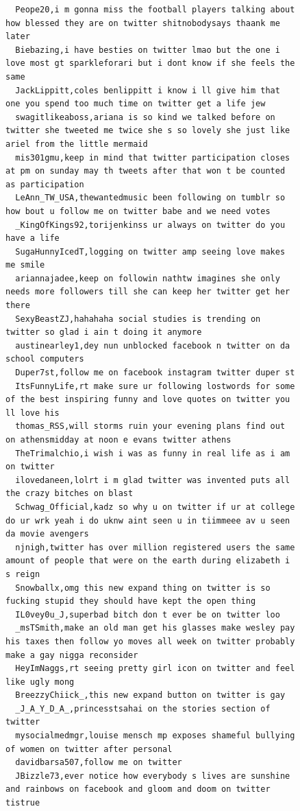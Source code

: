 \begin{figure}[htpb]
\begin{verbatim}
  Peope20,i m gonna miss the football players talking about how blessed they are on twitter shitnobodysays thaank me later
  Biebazing,i have besties on twitter lmao but the one i love most gt sparkleforari but i dont know if she feels the same
  JackLippitt,coles benlippitt i know i ll give him that one you spend too much time on twitter get a life jew
  swagitlikeaboss,ariana is so kind we talked before on twitter she tweeted me twice she s so lovely she just like ariel from the little mermaid
  mis301gmu,keep in mind that twitter participation closes at pm on sunday may th tweets after that won t be counted as participation
  LeAnn_TW_USA,thewantedmusic been following on tumblr so how bout u follow me on twitter babe and we need votes
  _KingOfKings92,torijenkinss ur always on twitter do you have a life
  SugaHunnyIcedT,logging on twitter amp seeing love makes me smile
  ariannajadee,keep on followin nathtw imagines she only needs more followers till she can keep her twitter get her there
  SexyBeastZJ,hahahaha social studies is trending on twitter so glad i ain t doing it anymore
  austinearley1,dey nun unblocked facebook n twitter on da school computers
  Duper7st,follow me on facebook instagram twitter duper st
  ItsFunnyLife,rt make sure ur following lostwords for some of the best inspiring funny and love quotes on twitter you ll love his
  thomas_RSS,will storms ruin your evening plans find out on athensmidday at noon e evans twitter athens
  TheTrimalchio,i wish i was as funny in real life as i am on twitter
  ilovedaneen,lolrt i m glad twitter was invented puts all the crazy bitches on blast
  Schwag_Official,kadz so why u on twitter if ur at college do ur wrk yeah i do uknw aint seen u in tiimmeee av u seen da movie avengers
  njnigh,twitter has over million registered users the same amount of people that were on the earth during elizabeth i s reign
  Snowballx,omg this new expand thing on twitter is so fucking stupid they should have kept the open thing
  IL0vey0u_J,superbad bitch don t ever be on twitter loo
  _msTSmith,make an old man get his glasses make wesley pay his taxes then follow yo moves all week on twitter probably make a gay nigga reconsider
  HeyImNaggs,rt seeing pretty girl icon on twitter and feel like ugly mong
  BreezzyChiick_,this new expand button on twitter is gay
  _J_A_Y_D_A_,princesstsahai on the stories section of twitter
  mysocialmedmgr,louise mensch mp exposes shameful bullying of women on twitter after personal
  davidbarsa507,follow me on twitter
  JBizzle73,ever notice how everybody s lives are sunshine and rainbows on facebook and gloom and doom on twitter tistrue

\end{verbatim}
\end{figure}
